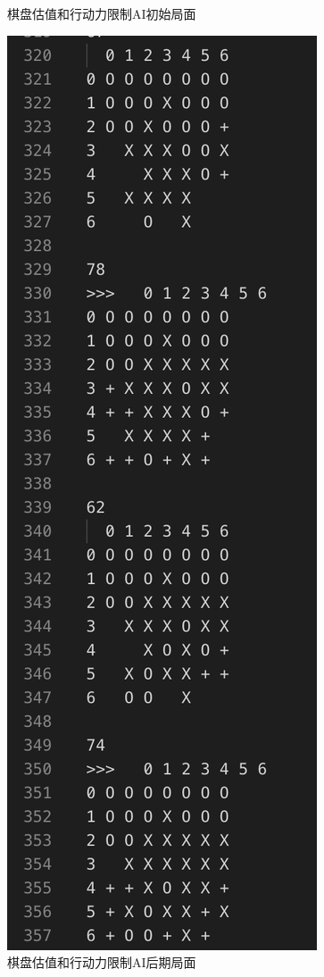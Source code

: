 \documentclass[a4paper]{article}
\begin{document}
\begin{figure}[!hbt]
\begin{minipage}{0.4\textwidth}
\caption{棋盘估值和行动力限制AI初始局面} \label{fig:ape0}
\end{minipage}\hfill
\begin{minipage}{0.4\textwidth}
    \centering
    \includegraphics[width=\linewidth]{assets/ape1.png}
\caption{棋盘估值和行动力限制AI后期局面} \label{fig:ape0}
\end{minipage}
\end{figure}
\end{document}
